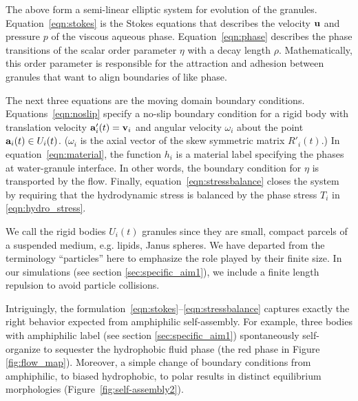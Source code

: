 The above form a semi-linear elliptic 
system for evolution of the granules.  Equation~\eqref{eqn:stokes} is the
Stokes equations that describes the velocity $\uu$ and pressure $p$ of
the viscous aqueous phase.  Equation~\eqref{eqn:phase} describes the
phase transitions of the scalar order parameter $\eta$ with a decay
length $\rho$. Mathematically, this order parameter is responsible for
the attraction and adhesion between granules that want to align boundaries
of like phase.

The next three equations are the moving domain boundary conditions.
Equations~\eqref{eqn:noslip} specify a no-slip
boundary condition for a rigid body with translation velocity $\aa'_i(t) = \vv_i$
and angular velocity $\omega_i$
about the point $\aa_i(t) \in U_i(t)$.
($\omega_i$ is the axial vector of the
skew symmetric matrix $R'_i(t)$.)
In
equation~\eqref{eqn:material}, the function $h_i$ is a material label
specifying the phases at water-granule interface.
In other words, the boundary condition for $\eta$ is transported by the flow.
Finally,
equation~\eqref{eqn:stressbalance} closes the system by requiring that
the hydrodynamic stress is balanced by the phase stress $T_i$ in
\eqref{eqn:hydro_stress}.

We call the rigid bodies $U_i(t)$ granules since they are small, compact
parcels of a suspended medium, e.g. lipids, Janus spheres.
We have departed from the terminology ``particles'' here
to emphasize the role played by their finite size. 
In our simulations
(see section \ref{sec:specific_aim1}),
we include a finite length repulsion to avoid particle
collisions.

Intriguingly, the
formulation~\eqref{eqn:stokes}--\eqref{eqn:stressbalance} captures
exactly the right behavior expected from amphiphilic self-assembly.
For example, three bodies with amphiphilic label
(see section \ref{sec:specific_aim1}) spontaneously
self-organize to sequester the hydrophobic fluid phase
(the red phase in Figure \ref{fig:flow_map}).
Moreover, a simple change of boundary conditions from
amphiphilic, to biased hydrophobic, to polar results in distinct
equilibrium morphologies (Figure~\ref{fig:self-assembly2}).

